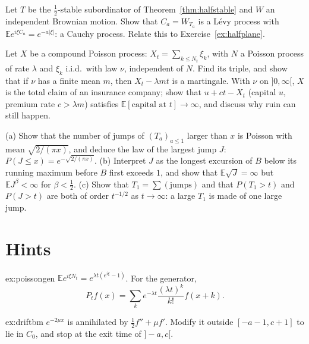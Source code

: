 \begin{exercise}[$\star\star$]\label{ex:cauchy}
Let $T$ be the $\frac12$-stable subordinator of Theorem~\ref{thm:halfstable} and $W$ an independent Brownian motion. Show that $C_a=W_{T_a}$ is a L\'evy process with $\mathbb Ee^{i\xi C_a}=e^{-a|\xi|}$: a Cauchy process. Relate this to
Exercise~\ref{ex:halfplane}.
\end{exercise}

\begin{exercise}[$\star\star$]\label{ex:compound}
Let $X$ be a compound Poisson process: $X_t=\sum_{k\le N_t}\xi_k$, with $N$ a Poisson process of rate $\lambda$ and $\xi_k$ i.i.d.\ with law $\nu$, independent of $N$. Find its triple, and show that if $\nu$ has a finite mean $m$, then $X_t-\lambda mt$
is a martingale. With $\nu$ on $]0,\infty[$, $X$ is the total claim of an insurance company; show that $u+ct-X_t$ (capital $u$, premium rate $c>\lambda m$) satisfies $\mathbb E[\text{capital at }t]\to\infty$, and discuss why ruin can still happen.
\end{exercise}

\begin{exercise}[$\star\star\star$]\label{ex:excursions}
(a) Show that the number of jumps of $(T_a)_{a\le1}$ larger than $x$ is Poisson with mean $\sqrt{2/(\pi x)}$, and deduce the law of the largest jump $J$: $P(J\le x)=e^{-\sqrt{2/(\pi x)}}$.
(b) Interpret $J$ as the longest excursion of $B$ below its running maximum before $B$ first exceeds $1$, and show that $\mathbb E\sqrt{J}=\infty$ but $\mathbb EJ^{\beta}<\infty$ for $\beta<\frac12$.
(c) Show that $T_1=\sum(\text{jumps})$ and that $P(T_1>t)$ and $P(J>t)$ are both of order $t^{-1/2}$ as $t\to\infty$: a large $T_1$ is made of one large jump.
\end{exercise}

\section{Hints}

\begin{hint}{ex:poissongen}
$\mathbb Ee^{i\xi N_t}=e^{\lambda t(e^{i\xi}-1)}$. For the generator,
\[
P_tf(x)=\sum_ke^{-\lambda t}\frac{(\lambda t)^k}{k!}f(x+k).
\]

\end{hint}

\begin{hint}{ex:driftbm}
$e^{-2\mu x}$ is annihilated by $\frac12f''+\mu f'$. Modify it outside $[-a-1,c+1]$ to lie in $C_0$, and stop at the exit time of $]-a,c[$.
\end{hint}

